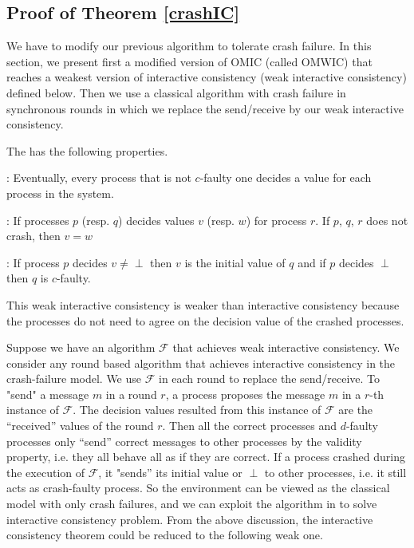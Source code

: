 \subsection{Proof of Theorem \ref{crashIC}}\label{app:thmCrash}


We have to modify our previous algorithm to tolerate crash failure.  
In this section, we present first  a modified version of OMIC (called OMWIC)
that reaches a weakest version of interactive consistency (weak interactive consistency)  
defined below. Then we use a classical algorithm \cite{lamport1982crash,dolev1982polynomial,dwork1990knowledge} with crash failure in synchronous rounds in which we replace the send/receive by our
weak interactive consistency.


The  {} has the
following properties.
\begin{itemizedot}
  \item {}: Eventually, every process  that is not $c$-faulty
  one decides a value for each process in the system.
  
  \item {}: If  processes $p$ (resp. $q$) decides values $v$ (resp. $w$)
  for process $r$. If $p$, $q$, $r$ does not crash, then $v=w$
  
  \item {}: If process $p$ decides $v\neq \perp$  then $v$ is the initial value of $q$ and if $p$ decides $\perp$ then $q$  is $c$-faulty.

\end{itemizedot}
This weak interactive consistency  is weaker than interactive consistency because  the  processes do not need to
agree on the decision value of the crashed processes.

Suppose we have an algorithm $\mathcal{F}$ that achieves weak interactive
consistency. 
We consider any round based algorithm that achieves interactive consistency in the crash-failure model.
We use $\mathcal{F}$ in each round to replace the send/receive.
 To "send" a message $m$ in a round $r$, a process proposes the message $m$ in a $r$-th instance of 
 $\mathcal{F}$.
The decision values resulted from this instance of $\mathcal{F}$ are  the ``received'' values of the round $r$.
Then all the correct
processes and $d$-faulty processes only ``send'' correct messages to other
processes by the validity property, i.e. they all  behave all as if they are
correct. If a process crashed during the execution of $\mathcal{F}$, it
"sends'' its initial value or $\perp$ to other processes, i.e. it still acts
as crash-faulty process. So the environment can be viewed as the classical
model with only crash failures, and we can exploit the algorithm in \cite{lamport1982crash,dolev1982polynomial,dwork1990knowledge} to
solve interactive consistency problem. From the above discussion, the
interactive consistency theorem could be reduced to the following weak one.

